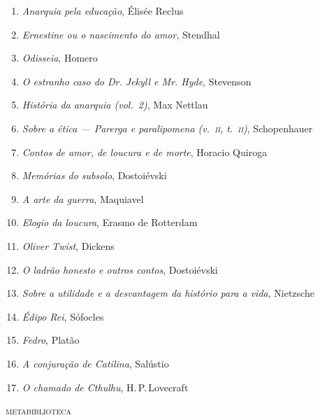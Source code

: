 \begin{enumerate}
\item \textit{Anarquia pela educação}, Élisée Reclus 
\item \textit{Ernestine ou o nascimento do amor}, Stendhal
\item \textit{Odisseia}, Homero
\item \textit{O estranho caso do Dr. Jekyll e Mr. Hyde}, Stevenson
\item \textit{História da anarquia (vol.~2)}, Max Nettlau
\item \textit{Sobre a ética --- Parerga e paralipomena (v.~\textsc{ii}, t.~\textsc{ii})}, Schopenhauer 
\item \textit{Contos de amor, de loucura e de morte}, Horacio Quiroga
\item \textit{Memórias do subsolo}, Dostoiévski
\item \textit{A arte da guerra}, Maquiavel
\item \textit{Elogio da loucura}, Erasmo de Rotterdam
\item \textit{Oliver Twist}, Dickens
\item \textit{O ladrão honesto e outros contos}, Dostoiévski
\item \textit{Sobre a utilidade e a desvantagem da histório para a vida}, Nietzsche
\item \textit{Édipo Rei}, Sófocles
\item \textit{Fedro}, Platão
\item \textit{A conjuração de Catilina}, Salústio
\item \textit{O chamado de Cthulhu}, H.\,P.\,Lovecraft
\end{enumerate}\medskip


{\large\textsc{metabiblioteca}}\\

